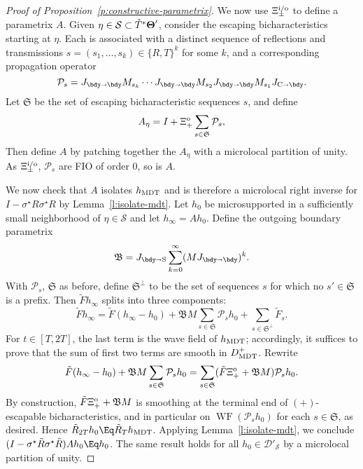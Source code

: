 \documentclass[10pt]{article}
\theoremstyle{plain}
\theoremstyle{definition}
\theoremstyle{remark}
\numberwithin{theorem}{section}
\numberwithin{example}{section}
\numberwithin{equation}{section}
\numberwithin{figure}{section}
\newcommand\bTheta{\boldsymbol\Theta}
\newcommand\To{\smash{\mathring T}\vphantom{T}}			%
\DeclareMathOperator\WF{WF}		%
\newcommand\MDT{\ensuremath{_{\text{\normalfont MDT}}}}	%
\newcommand\JCB{J_{\text C\shortrightarrow \bdy}}		%
\newcommand\JBS{J_{\bdy\shortrightarrow \text S}}		%
\newcommand\JBB{J_{\bdy\shortrightarrow \bdy}}			%
\newcommand\supo{^{\text o}}						%
\newcommand\supio{^{\smash{\text i/\text o}}}			%
\newcommand\eqml{\Eq}					%
\begin{document}
\begin{proof}[Proof of Proposition~\ref{p:constructive-parametrix}]
	We now use $\Xi\supio_\pm$ to define a parametrix $A$.
	Given $\eta\in \mathcal S\subset \To^*\bTheta'$, consider the escaping bicharacteristics starting at $\eta$. Each is associated with a distinct sequence of reflections and transmissions $s=(s_1,\dotsc,s_k)\in \{R,T\}^k$ for some $k$, and a corresponding propagation operator
	\begin{equation}
		\mathcal P_s = \JBB M_{s_k}\dotsb\JBB M_{s_2}\JBB M_{s_1}\JCB.
	\end{equation}
Let $\mathfrak S$ be the set of escaping bicharacteristic sequences $s$, and define
	\begin{equation}
		A_\eta = I + \Xi\supo_+\sum_{s\in\mathfrak S} \mathcal P_s,
		\label{e:def-A-eta}
	\end{equation}
	Then define $A$ by patching together the $A_\eta$ with a microlocal partition of unity. As $\Xi\supio_\pm$\!, $\mathcal P_s$ are FIO of order 0, so is $A$.
	
	We now check that $A$ isolates $h\MDT$ and is therefore a microlocal right inverse for $I-\sigma^\star R\sigma^\star R$ by Lemma~\ref{l:isolate-mdt}. Let $h_0$ be microsupported in a sufficiently small neighborhood of $\eta\in\mathcal S$ and let $h_\infty = Ah_0$. Define the outgoing boundary parametrix
	\begin{equation}
		\mathfrak B = \JBS \sum_{k=0}^\infty (M\JBB)^k.
	\end{equation}
	With $\mathcal P_s$, $\mathfrak S$ as before, define $\mathfrak S^\perp$ to be the set of sequences $s$ for which no $s'\in\mathfrak S$ is a prefix. Then $\tilde Fh_\infty$ splits into three components:
	\begin{equation}
		\tilde Fh_\infty = \tilde F(h_\infty-h_0) + \mathfrak B M \sum_{s\in\mathfrak S}\mathcal P_sh_0 + \sum_{s\in\mathfrak S^\perp} \tilde F_s.
	\end{equation}
	For $t\in[T,2T]$, the last term is the wave field of $h\MDT$; accordingly, it suffices to prove that the sum of first two terms are smooth in $D^+\MDT$. Rewrite
	\begin{equation}
		\tilde F(h_\infty-h_0) + \mathfrak BM \sum_{s\in\mathfrak S}\mathcal P_sh_0
		=
		\sum_{s\in\mathfrak S} (\tilde F\Xi\supo_+ + \mathfrak BM) \mathcal P_s h_0.
	\end{equation}
	By construction, $\tilde F\Xi\supo_+ + \mathfrak BM$ is smoothing at the terminal end of $(+)$-escapable bicharacteristics, and in particular on $\WF(\mathcal P_s h_0)$ for each $s\in\mathfrak S$, as desired. Hence $\tilde R_{2T} h_0\eqml\tilde R_T h\MDT$. Applying Lemma~\ref{l:isolate-mdt}, we conclude $(I-\sigma^\star\tilde R\sigma^\star\tilde R)Ah_0\eqml h_0$. The same result holds for all $h_0\in\mathcal D'_{\mathcal S}$ by a microlocal partition of unity.
\end{proof}
\end{document}
